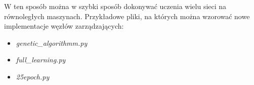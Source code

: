 W ten sposób można w szybki sposób dokonywać uczenia wielu sieci na równoległych maszynach.
Przykładowe pliki, na których można wzorować nowe implementacje węzłów zarządzających:

\begin{itemize}
  \item \textit{genetic\_algorithmm.py}
  \item \textit{full\_learning.py}
  \item \textit{25epoch.py}
\end{itemize}
